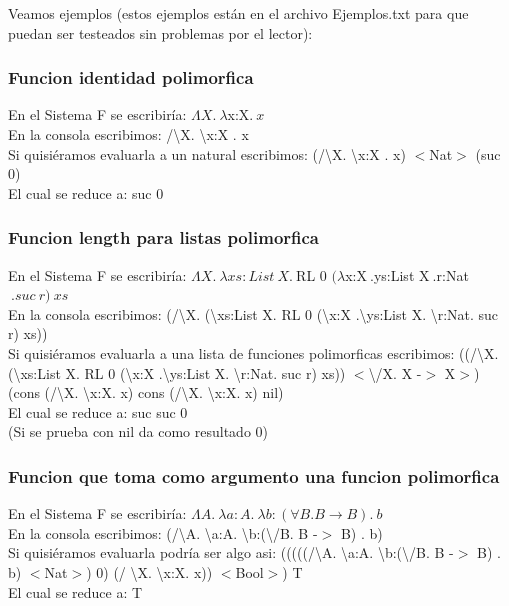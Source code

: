 \documentclass[12pt, titlepage, a4paper]{article}
\begin{document}
Veamos ejemplos (estos ejemplos están en el archivo Ejemplos.txt para que puedan ser testeados sin problemas por el lector):

\subsubsection{Funcion identidad polimorfica}
\noindent En el Sistema F se escribiría: $\Lambda X.\ \lambda $x:X$. \ x$ \\
En la consola escribimos: /\textbackslash X. \textbackslash x:X . x \\
Si quisiéramos evaluarla a un natural escribimos: (/\textbackslash X. \textbackslash x:X . x)  $<$Nat$>$ (suc 0) \\
El cual se reduce a: suc 0

\subsubsection{Funcion length para listas polimorfica}
\noindent En el Sistema F se escribiría: $\Lambda X.\ \lambda xs:List \ X. \ $RL 0 $(\lambda $x:X$ \ .$ys:List X$ \ .$r:Nat$\ .suc\ r)\ xs$ \\
En la consola escribimos: (/\textbackslash X. (\textbackslash xs:List X. RL 0 (\textbackslash x:X .\textbackslash ys:List X. \textbackslash r:Nat. suc r) xs)) \\
Si quisiéramos evaluarla a una lista de funciones polimorficas escribimos: 
((/\textbackslash X. (\textbackslash xs:List X. RL 0 (\textbackslash x:X .\textbackslash ys:List X. \textbackslash r:Nat. suc r) xs)) $<$\textbackslash/X. X -$>$ X$>$) 
(cons (/\textbackslash X. \textbackslash x:X. x) cons (/\textbackslash X. \textbackslash x:X. x) nil)\\
El cual se reduce a: suc suc 0 \\

\noindent (Si se prueba con nil da como resultado 0)

\subsubsection{Funcion que toma como argumento una funcion polimorfica}
\noindent En el Sistema F se escribiría: $\Lambda A.\ \lambda a:A.\ \lambda b:(\forall B. B \rightarrow  B). \ b$ \\
En la consola escribimos: (/\textbackslash A. \textbackslash a:A. \textbackslash b:(\textbackslash /B. B -$>$ B) . b)\\
Si quisiéramos evaluarla podría ser algo asi: (((((/\textbackslash A. \textbackslash a:A. \textbackslash b:(\textbackslash /B. B -$>$ B) . b) $<$Nat$>$) 0) (/ \textbackslash X. \textbackslash x:X. x)) $<$Bool$>$) T\\
El cual se reduce a: T

\newpage



\end{document}
